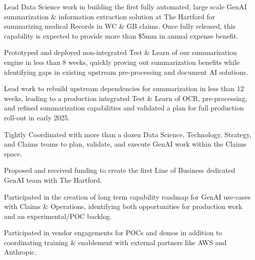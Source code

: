 \documentclass[letterpaper]{deedy-resume} %
\begin{document}
\begin{minipage}[t]{0.68\textwidth}
  \hfill
  \vspace{\topsep}
  \begin{tightitemize}
    \item Lead Data Science work in building the first fully automated, large scale GenAI summarization \&
      information extraction solution at The Hartford for summarizing medical Records in WC \& GB claims.  
      Once fully released, this capability is expected to provide more than \$5mm in annual expense benefit.
    \item Prototyped and deployed non-integrated Test \& Learn of our summarization
      engine in less than 8 weeks, quickly proving out summarization benefits while
      identifying gaps in existing upstream pre-processing and document AI solutions.
    \item Lead work to rebuild upstream dependencies for summarization in less than 12 weeks, 
      leading to a production integrated Test \& Learn of OCR, pre-processing, and refined
      summarization capabilities and validated a plan for full production roll-out in early 2025.
    \item Tightly Coordinated with more than a dozen Data Science, Technology, Strategy, and Claims teams
      to plan, validate, and execute GenAI work within the Claims space.
    \item Proposed and received funding to create the first Line of Business dedicated
      GenAI team with The Hartford.
    \item Participated in the creation of long term capability roadmap for GenAI 
      use-cases with Claims \& Operations, identifying both opportunities for production 
      work and an experimental/POC backlog.
    \item Participated in vendor engagements for POCs and demos in addition to coordinating
      training \& enablement with external partners like AWS and Anthropic.
  \end{tightitemize}
  \sectionspace
  

\end{minipage}
\end{document}
